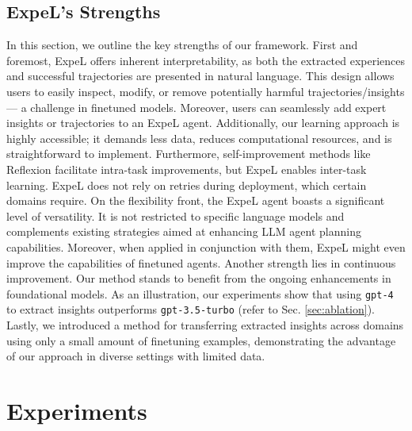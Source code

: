 \documentclass[letterpaper]{article} %
\begin{document}
\subsection{ExpeL's Strengths}
In this section, we outline the key strengths of our framework. First and foremost, ExpeL offers inherent interpretability, as both the extracted experiences and successful trajectories are presented in natural language. This design allows users to easily inspect, modify, or remove potentially harmful trajectories/insights — a challenge in finetuned models. Moreover, users can seamlessly add expert insights or trajectories to an ExpeL agent. Additionally, our learning approach is highly accessible; it demands less data, reduces computational resources, and is straightforward to implement. Furthermore, self-improvement methods like Reflexion \cite{shinn2023reflexion} facilitate intra-task improvements, but ExpeL enables inter-task learning. ExpeL does not rely on retries during deployment, which certain domains require. On the flexibility front, the ExpeL agent boasts a significant level of versatility. It is not restricted to specific language models and complements existing strategies aimed at enhancing LLM agent planning capabilities. Moreover, when applied in conjunction with them, ExpeL might even improve the capabilities of finetuned agents. Another strength lies in continuous improvement. Our method stands to benefit from the ongoing enhancements in foundational models. As an illustration, our experiments show that using \texttt{gpt-4} to extract insights outperforms \texttt{gpt-3.5-turbo} (refer to Sec. \ref{sec:ablation}). Lastly, we introduced a method for transferring extracted insights across domains using only a small amount of finetuning examples, demonstrating the advantage of our approach in diverse settings with limited data.

\section{Experiments}
\end{document}
